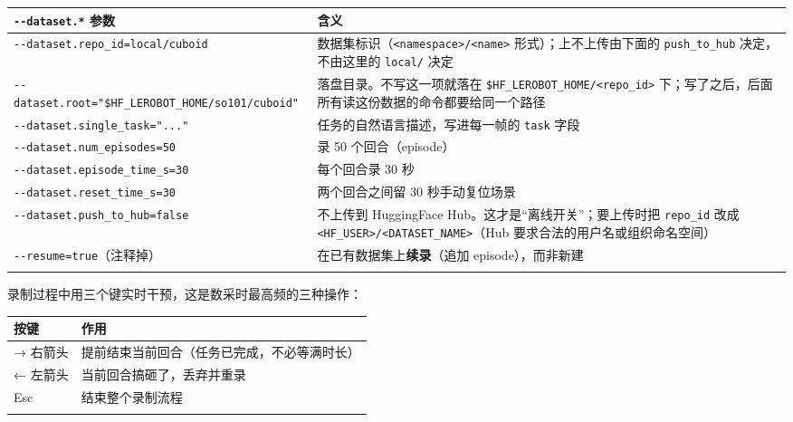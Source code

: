 \documentclass[
  chinese,
]{ctexart}
\begin{document}
\begin{center}
\begin{tabular}{@{}>{\raggedright\arraybackslash}p{} >{\raggedright\arraybackslash}p{}@{}}
\toprule\noalign{}
\texttt{-\/-dataset.*} 参数 & 含义 \\
\midrule\noalign{}
\texttt{-\/-dataset.repo\_\allowbreak id=local/cuboid} & 数据集标识（\texttt{\textless{}namespace\textgreater{}/\textless{}name\textgreater{}} 形式）；上不上传由下面的 \texttt{push\_\allowbreak to\_\allowbreak hub} 决定，不由这里的 \texttt{local/} 决定 \\
\texttt{-\/-dataset.root="\$HF\_\allowbreak LEROBOT\_\allowbreak HOME/so101/cuboid"} & 落盘目录。不写这一项就落在 \texttt{\$HF\_\allowbreak LEROBOT\_\allowbreak HOME/\textless{}repo\_\allowbreak id\textgreater{}} 下；写了之后，后面所有读这份数据的命令都要给同一个路径 \\
\texttt{-\/-dataset.single\_\allowbreak task="..."} & 任务的自然语言描述，写进每一帧的 \texttt{task} 字段 \\
\texttt{-\/-dataset.num\_\allowbreak episodes=50} & 录 50 个回合（episode） \\
\texttt{-\/-dataset.episode\_\allowbreak time\_\allowbreak s=30} & 每个回合录 30 秒 \\
\texttt{-\/-dataset.reset\_\allowbreak time\_\allowbreak s=30} & 两个回合之间留 30 秒手动复位场景 \\
\texttt{-\/-dataset.push\_\allowbreak to\_\allowbreak hub=false} & 不上传到 HuggingFace Hub。这才是``离线开关''；要上传时把 \texttt{repo\_\allowbreak id} 改成 \texttt{\textless{}HF\_\allowbreak USER\textgreater{}/\textless{}DATASET\_\allowbreak NAME\textgreater{}}（Hub 要求合法的用户名或组织命名空间） \\
\texttt{-\/-resume=true}（注释掉） & 在已有数据集上\textbf{续录}（追加 episode），而非新建 \\
\bottomrule\noalign{}
\end{tabular}
\end{center}

录制过程中用三个键实时干预，这是数采时最高频的三种操作：

\begin{center}
\begin{tabular}{@{}>{\raggedright\arraybackslash}p{} >{\raggedright\arraybackslash}p{}@{}}
\toprule\noalign{}
按键 & 作用 \\
\midrule\noalign{}
→ 右箭头 & 提前结束当前回合（任务已完成，不必等满时长） \\
← 左箭头 & 当前回合搞砸了，丢弃并重录 \\
Esc & 结束整个录制流程 \\
\bottomrule\noalign{}
\end{tabular}
\end{center}
\end{document}
